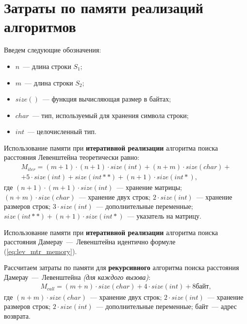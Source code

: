 \section{Затраты по памяти реализаций алгоритмов}

Введем следующие обозначения:
\begin{itemize}
	\item$n$~--- длина строки $S_{1}$;
	\item$m$~--- длина строки $S_{2}$;
	\item$size()$~--- функция вычисляющая размер в байтах;
	\item $char$~--- тип, используемый для хранения символа строки;
	\item $int$~--- целочисленный тип.
\end{itemize}

Использование памяти при \textbf{итеративной реализации} алгоритма поиска расстояния Левенштейна теоретически равно:
\begin{equation}
	\label{eq:lev_mtr_memory}
	\begin{aligned}
		M_{iter} = (m + 1) \cdot (n + 1) \cdot size(int) + (n + m) \cdot size(char) + \\ + 5 \cdot size(int) + size(int **) + (n + 1) \cdot size(int *),
	\end{aligned}
\end{equation}
где $(n + 1) \cdot (m + 1) \cdot size(int)$~--- хранение матрицы;
\newline $(n + m) \cdot size(char)$~--- хранение двух строк;
\newline $2 \cdot size(int)$~--- хранение размеров строк;
\newline $3 \cdot size(int)$~--- дополнительные переменные;
\newline $size(int**) + (n + 1) \cdot size(int *)$~--- указатель на матрицу.

Использование памяти при \textbf{итеративной реализации} алгоритма поиска расстояния Дамерау~---~Левенштейна идентично формуле (\ref{eq:lev_mtr_memory}).

Рассчитаем затраты по памяти для \textbf{рекурсивного} алгоритма поиска расстояния Дамерау~---~Левенштейна\textit{ (для каждого вызова)}:
\begin{equation}
	\begin{aligned}
		M_{call} = (m + n) \cdot size(char) + 4 \cdot size(int) + 8 байт,
	\end{aligned}
\end{equation}
где $(n + m) \cdot size(char)$~--- хранение двух строк;
\newline $2 \cdot size(int)$~--- хранение размеров строк;
\newline $2 \cdot size(int)$~--- дополнительные переменные;
 байт~--- адрес возврата.

